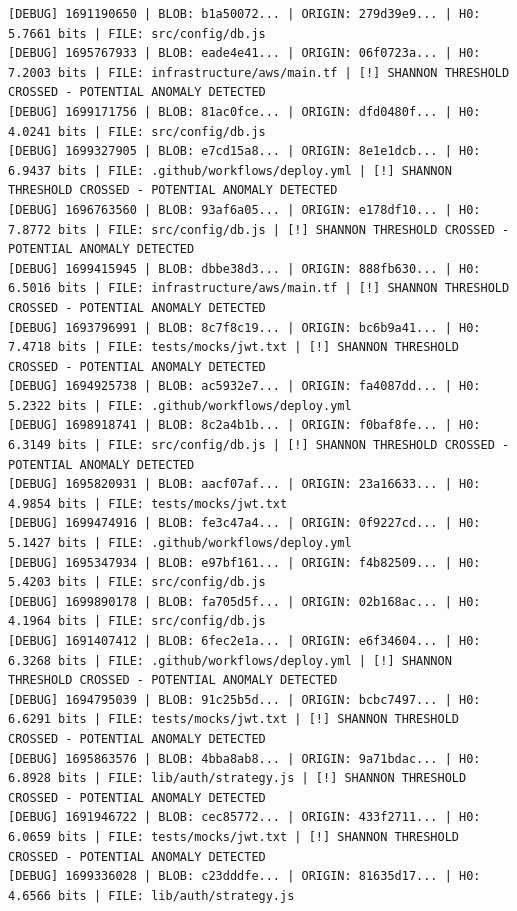 \documentclass[12pt, a4paper, oneside]{report}
\begin{document}
\begin{lstlisting}[basicstyle=\tiny\ttfamily]
[DEBUG] 1691190650 | BLOB: b1a50072... | ORIGIN: 279d39e9... | H0: 5.7661 bits | FILE: src/config/db.js
[DEBUG] 1695767933 | BLOB: eade4e41... | ORIGIN: 06f0723a... | H0: 7.2003 bits | FILE: infrastructure/aws/main.tf | [!] SHANNON THRESHOLD CROSSED - POTENTIAL ANOMALY DETECTED
[DEBUG] 1699171756 | BLOB: 81ac0fce... | ORIGIN: dfd0480f... | H0: 4.0241 bits | FILE: src/config/db.js
[DEBUG] 1699327905 | BLOB: e7cd15a8... | ORIGIN: 8e1e1dcb... | H0: 6.9437 bits | FILE: .github/workflows/deploy.yml | [!] SHANNON THRESHOLD CROSSED - POTENTIAL ANOMALY DETECTED
[DEBUG] 1696763560 | BLOB: 93af6a05... | ORIGIN: e178df10... | H0: 7.8772 bits | FILE: src/config/db.js | [!] SHANNON THRESHOLD CROSSED - POTENTIAL ANOMALY DETECTED
[DEBUG] 1699415945 | BLOB: dbbe38d3... | ORIGIN: 888fb630... | H0: 6.5016 bits | FILE: infrastructure/aws/main.tf | [!] SHANNON THRESHOLD CROSSED - POTENTIAL ANOMALY DETECTED
[DEBUG] 1693796991 | BLOB: 8c7f8c19... | ORIGIN: bc6b9a41... | H0: 7.4718 bits | FILE: tests/mocks/jwt.txt | [!] SHANNON THRESHOLD CROSSED - POTENTIAL ANOMALY DETECTED
[DEBUG] 1694925738 | BLOB: ac5932e7... | ORIGIN: fa4087dd... | H0: 5.2322 bits | FILE: .github/workflows/deploy.yml
[DEBUG] 1698918741 | BLOB: 8c2a4b1b... | ORIGIN: f0baf8fe... | H0: 6.3149 bits | FILE: src/config/db.js | [!] SHANNON THRESHOLD CROSSED - POTENTIAL ANOMALY DETECTED
[DEBUG] 1695820931 | BLOB: aacf07af... | ORIGIN: 23a16633... | H0: 4.9854 bits | FILE: tests/mocks/jwt.txt
[DEBUG] 1699474916 | BLOB: fe3c47a4... | ORIGIN: 0f9227cd... | H0: 5.1427 bits | FILE: .github/workflows/deploy.yml
[DEBUG] 1695347934 | BLOB: e97bf161... | ORIGIN: f4b82509... | H0: 5.4203 bits | FILE: src/config/db.js
[DEBUG] 1699890178 | BLOB: fa705d5f... | ORIGIN: 02b168ac... | H0: 4.1964 bits | FILE: src/config/db.js
[DEBUG] 1691407412 | BLOB: 6fec2e1a... | ORIGIN: e6f34604... | H0: 6.3268 bits | FILE: .github/workflows/deploy.yml | [!] SHANNON THRESHOLD CROSSED - POTENTIAL ANOMALY DETECTED
[DEBUG] 1694795039 | BLOB: 91c25b5d... | ORIGIN: bcbc7497... | H0: 6.6291 bits | FILE: tests/mocks/jwt.txt | [!] SHANNON THRESHOLD CROSSED - POTENTIAL ANOMALY DETECTED
[DEBUG] 1695863576 | BLOB: 4bba8ab8... | ORIGIN: 9a71bdac... | H0: 6.8928 bits | FILE: lib/auth/strategy.js | [!] SHANNON THRESHOLD CROSSED - POTENTIAL ANOMALY DETECTED
[DEBUG] 1691946722 | BLOB: cec85772... | ORIGIN: 433f2711... | H0: 6.0659 bits | FILE: tests/mocks/jwt.txt | [!] SHANNON THRESHOLD CROSSED - POTENTIAL ANOMALY DETECTED
[DEBUG] 1699336028 | BLOB: c23dddfe... | ORIGIN: 81635d17... | H0: 4.6566 bits | FILE: lib/auth/strategy.js

\end{lstlisting}
\end{document}
